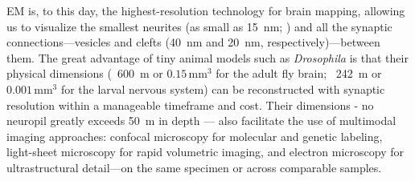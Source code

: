 EM is, to this day, the highest-resolution technology for brain mapping, allowing us to visualize the smallest neurites (as small as 15~nm; \citep{meinertzhagen2016connectome}) and all the synaptic connections—vesicles and clefts (40~nm and 20~nm, respectively)—between them. The great advantage of tiny animal models such as \textit{Drosophila} is that their physical dimensions (~600~\textmu m or $0.15\,\mathrm{mm}^3$ for the adult fly brain; ~242~\textmu m or $0.001\,\mathrm{mm}^3$ for the larval nervous system) can be reconstructed with synaptic resolution within a manageable timeframe and cost. Their dimensions - no neuropil greatly exceeds 50~\textmu m in depth \citep{meinertzhagen2016connectome} — also facilitate the use of multimodal imaging approaches: confocal microscopy for molecular and genetic labeling, light-sheet microscopy for rapid volumetric imaging, and electron microscopy for ultrastructural detail—on the same specimen or across comparable samples.


        \begin{table}[t]
        \centering
        \small
        \setlength{\tabcolsep}{4pt}
        \renewcommand{\arraystretch}{1.1}
        \caption{Comparison of major connectomic datasets across species, from \textit{C. elegans} to mouse visual cortex. Abbreviations: ssTEM, serial-section TEM; SBF/MB-EM, serial block-face or multi-beam EM.}
        \label{table-connectomes}
        \end{table}


